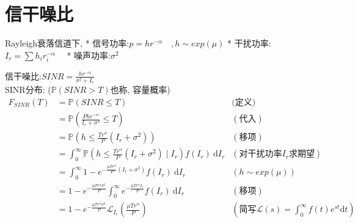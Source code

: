     \section{信干噪比}
        Rayleigh衰落信道下,
        * 信号功率:\quad $p = h r^{-\alpha} \quad ,h\sim exp(\mu)$
        * 干扰功率:\quad $I_r = \sum h_i r_i^{-\alpha} \quad$
        * 噪声功率:\quad $\sigma^2$
        

        信干噪比:\quad $SINR = \frac{h r^{-\alpha}}{\sigma^2 + I_r}$\\
        SINR分布: ($\mathbb{P}\left(SINR > T\right)$也称, 容量概率)
        \begin{align*}
            F_{SINR}(T) 
            &= \mathbb{P}\left(SINR \le T\right) & \text{(定义)}\\
            &= \mathbb{P}\left(\frac{P h r^{-\alpha}}{I_r +\sigma^{2}} \leq T\right) & (\text{代入}) \\
            &= \mathbb{P}\left(h \leq \frac{T r^\alpha}{P} (I_r + \sigma^2) \right) & (\text{移项}) \\
            &= \int_{0}^{\infty} \mathbb{P}\left(h \leq \frac{T r^\alpha}{P} (I_r + \sigma^2) \mid I_r \right) f(I_r) \mathrm{~d} I_r & (\text{对干扰功率$I_r$求期望}) \\
            &= \int_{0}^{\infty} 1 - e^{- \frac{\mu T r^\alpha}{P}(I_r + \sigma^2)}  f(I_r) \mathrm{~d} I_r & (h \sim exp(\mu))\\
            &= 1 - e^{- \frac{\mu T r^\alpha \sigma^2}{P}} \int_{0}^{\infty} e^{- \frac{\mu T r^\alpha I_r}{P}} f(I_r) \mathrm{~d} I_r & (\text{移项})\\
            &= 1 - e^{- \frac{\mu T r^\alpha \sigma^2}{P}} \mathcal{L}_{I_{r}}\left(\frac{\mu T r^{\alpha}}{P}\right) & (\text{简写}\mathcal{L}(s) = \int_0^{\infty} f(t) e^{st} \mathrm{d} t)
        \end{align*}
    
